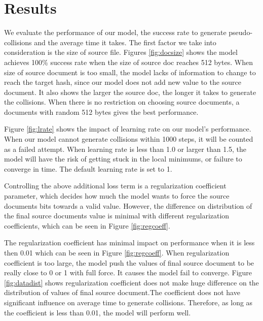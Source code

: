 \documentclass{article}
\begin{document}
\section{Results}
We evaluate the performance of our model, the success rate to generate pseudo-collisions and  the average time it takes. The first factor we take into consideration is the size of source file. Figures \ref{fig:docsize} shows the model achieves 100\% success rate when the size of source doc reaches 512 bytes. When size of source document is too small, the model lacks of information to change to reach the target hash, since our model does not add new value to the source document. It also shows the larger the source doc, the longer it takes to generate the collisions. When there is no restriction on choosing source documents, a documents with random 512 bytes gives the best performance.

Figure \ref{fig:lrate} shows the impact of learning rate on our model's performance. When our model cannot generate collisions within 1000 steps, it will be counted as a failed attempt. When learning rate is less than 1.0 or larger than 1.5, the model will have the risk of getting stuck in the local minimums, or failure to converge in time. The default learning rate is set to 1.

Controlling the above additional loss term is a regularization coefficient parameter, which decides how much the model wants to force the source documents bits towards a valid value. However, the difference on distribution of the final source documents value is minimal with different regularization coefficients, which can be seen in Figure \ref{fig:regcoeff}.

The regularization coefficient has minimal impact on performance when it is less then 0.01 which can be seen in Figure \ref{fig:regcoeff}. When regularization coefficient is too large, the model push the values of final source document to be really close to 0 or 1 with full force. It causes the model fail to converge. Figure \ref{fig:datadist} shows regularization coefficient does not make huge difference on the distribution of values of final source document.The coefficient does not have significant influence on average time to generate collisions. Therefore, as long as the coefficient is less than 0.01, the model will perform well.
\end{document}
